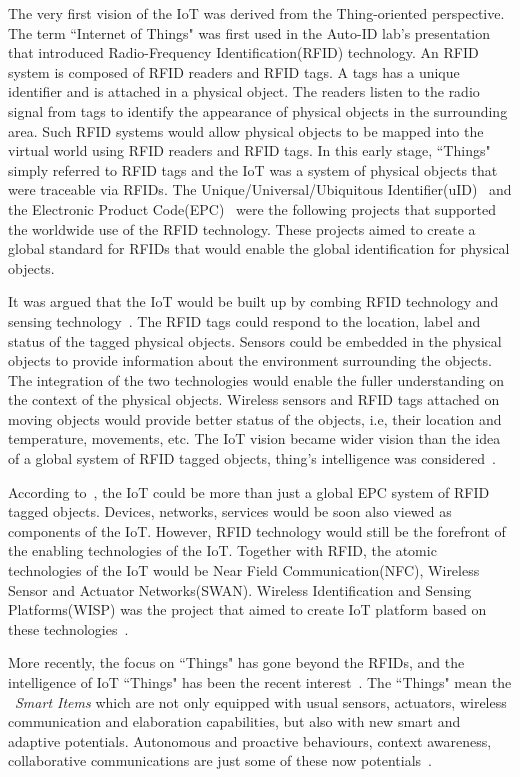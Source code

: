 The very first vision of the IoT was derived from the Thing-oriented perspective.
The term ``Internet of Things" was first used in the Auto-ID lab's presentation that introduced Radio-Frequency Identification(RFID) technology. 
An RFID system is composed of RFID readers and RFID tags.
A tags has a unique identifier and is attached in a physical object.
The readers listen to the radio signal from tags to identify the appearance of physical objects in the surrounding area. 
Such RFID systems would allow physical objects to be mapped into the virtual world using RFID readers and RFID tags.
In this early stage, ``Things" simply referred to RFID tags and the IoT was a system of physical objects that were traceable via RFIDs. 
The Unique/Universal/Ubiquitous Identifier(uID)~\citep{Sakamura:2006} and the Electronic Product Code(EPC)~\citep{Armenio:2007} were the following projects that supported the worldwide use of the RFID technology.
These projects aimed to create a global standard for RFIDs that would enable the global identification for physical objects.

It was argued that the IoT would be built up by combing RFID technology and sensing technology~\citep{ITU:2005}.
The RFID tags could respond to the location, label and status of the tagged physical objects.
Sensors could be embedded in the physical objects to provide information about the environment surrounding the objects. 
The integration of the two technologies would enable the fuller understanding on the context of the physical objects.
Wireless sensors and RFID tags attached on moving objects would provide better status of the objects, i.e, their location and temperature, movements, etc.
The IoT vision became wider vision than the idea of a global system of RFID tagged objects, thing's intelligence was considered~\citep{Sterling:2005}. 

According to~\cite{Presser:2009}, the IoT could be more than just a global EPC system of RFID tagged objects.
Devices, networks, services would be soon also viewed as components of the IoT.
However, RFID technology would still be the forefront of the enabling technologies of the IoT.
Together with RFID, the atomic technologies of the IoT would be Near Field Communication(NFC), Wireless Sensor and Actuator Networks(SWAN).
Wireless Identification and Sensing Platforms(WISP) was the project that aimed to create IoT platform based on these technologies~\citep{Buettner:2008}.

More recently, the focus on ``Things" has gone beyond the RFIDs, and the intelligence of IoT ``Things" has been the recent interest~\citep{Sundmaeker:2010}.
The ``Things" mean the ~\textit{Smart Items} which are not only equipped with usual sensors, actuators, wireless communication and elaboration capabilities, but also with new smart and adaptive potentials.
Autonomous and proactive behaviours, context awareness, collaborative communications are just some of these now potentials~\citep{Atzori:2014}.

